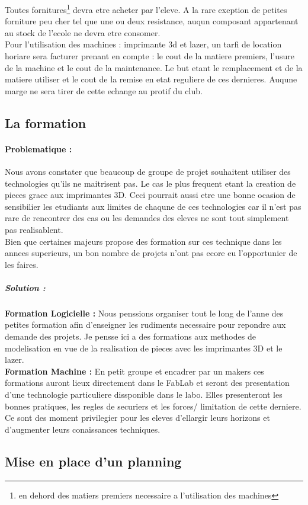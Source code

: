 \documentclass[12pt,a4paper]{article}
\begin{document}
Toutes fornitures\footnote{en dehord des matiers premiers necessaire a l'utilisation des machines } devra etre acheter par l'eleve. A la rare exeption de petites forniture peu cher tel que une ou deux resistance, auqun composant appartenant au stock de l'ecole ne devra etre consomer.\\
Pour l'utilisation des machines : imprimante 3d et lazer, un tarfi de location horiare sera facturer prenant en compte : le cout de la matiere premiers, l'usure de la machine et le cout de la maintenance. Le but etant le remplacement et de la matiere utiliser et le cout de la remise en etat reguliere de ces dernieres. Auqune marge ne sera tirer de cette echange au protif du club.
\subsection{La formation}
\paragraph{Problematique : }
Nous avons constater que beaucoup de groupe de projet souhaitent utiliser des technologies qu'ils ne maitrisent pas. Le cas le plus frequent etant la creation de pieces grace aux imprimantes 3D. Ceci pourrait aussi etre une bonne ocasion de sensibilier les etudiants aux limites de chaqune de ces technologies car il n'est pas rare de rencontrer des cas ou les demandes des eleves ne sont tout simplement pas realisablent.\\
Bien que certaines majeurs propose des formation sur ces technique dans les annees superieurs, un bon nombre de projets n'ont pas ecore eu l'opportunier de les faires. 
\subparagraph{Solution : }
\textbf{Formation Logicielle :} Nous penssions organiser tout le long de l'anne des petites formation afin d'enseigner les rudiments necessaire pour repondre aux demande des projets. Je pensse ici a des formations aux methodes de modelisation en vue de la realisation de pieces avec les imprimantes 3D et le lazer. \\
\textbf{Formation Machine :} En petit groupe et encadrer par un makers ces formations auront lieux directement dans le FabLab et seront des presentation d'une technologie particuliere dissponible dans le labo. Elles presenteront les bonnes pratiques, les regles de securiers et les forces/ limitation de cette derniere. Ce sont des moment privilegier pour les eleves d'ellargir leurs horizons et d'augmenter leurs conaissances techniques.
\subsection{Mise en place d'un planning}
\end{document}
